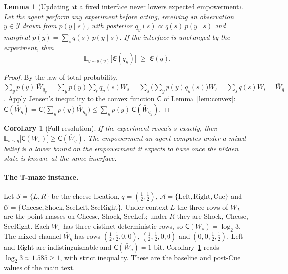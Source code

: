 \documentclass[letterpaper]{article} %
\newtheorem{lemma}{Lemma}
\newtheorem{corollary}{Corollary}
\theoremstyle{definition}
\providecommand{\E}{\mathbb{E}}
\providecommand{\cA}{\mathcal{A}}
\providecommand{\cO}{\mathcal{O}}
\providecommand{\cS}{\mathcal{S}}
\providecommand{\Emp}{\mathfrak{E}}
\providecommand{\Capa}{\mathsf{C}}
\begin{document}
\begin{lemma}[Updating at a fixed interface never lowers expected empowerment]
\label{lem:update}
Let the agent perform any experiment before acting, receiving an observation $y \in \mathcal{Y}$ drawn from $p(y \mid s)$, with posterior $q_y(s) \propto q(s)\, p(y \mid s)$ and marginal $p(y) = \sum_s q(s)\, p(y \mid s)$. If the interface is unchanged by the experiment, then
\begin{equation}
  \E_{y \sim p(y)}\big[\Emp(q_y)\big] \;\ge\; \Emp(q).
  \label{eq:update}
\end{equation}
\end{lemma}
\begin{proof}
By the law of total probability, $\sum_y p(y)\, \bar W_{q_y} = \sum_y p(y) \sum_s q_y(s) W_s = \sum_s \big(\sum_y p(y) q_y(s)\big) W_s = \sum_s q(s) W_s = \bar W_q$. Apply Jensen's inequality to the convex function $\Capa$ of Lemma~\ref{lem:convex}: $\Capa(\bar W_q) = \Capa\big(\sum_y p(y) \bar W_{q_y}\big) \le \sum_y p(y)\, \Capa(\bar W_{q_y})$.
\end{proof}

\begin{corollary}[Full resolution]
\label{cor:resolve}
If the experiment reveals $s$ exactly, then $\E_{s \sim q}\big[\Capa(W_s)\big] \ge \Capa(\bar W_q)$. The empowerment an agent computes under a mixed belief is a lower bound on the empowerment it expects to have once the hidden state is known, at the same interface.
\end{corollary}

\paragraph{The T-maze instance.}
Let $\cS = \{L, R\}$ be the cheese location, $q = (\tfrac12, \tfrac12)$, $\cA = \{\text{Left}, \text{Right}, \text{Cue}\}$ and $\cO = \{\text{Cheese}, \text{Shock}, \text{SeeLeft}, \text{SeeRight}\}$. Under context $L$ the three rows of $W_L$ are the point masses on Cheese, Shock, SeeLeft; under $R$ they are Shock, Cheese, SeeRight. Each $W_s$ has three distinct deterministic rows, so $\Capa(W_s) = \log_2 3$. The mixed channel $\bar W_q$ has rows $(\tfrac12, \tfrac12, 0, 0)$, $(\tfrac12, \tfrac12, 0, 0)$ and $(0, 0, \tfrac12, \tfrac12)$. Left and Right are indistinguishable and $\Capa(\bar W_q) = 1$ bit. Corollary~\ref{cor:resolve} reads $\log_2 3 \approx 1.585 \ge 1$, with strict inequality. These are the baseline and post-Cue values of the main text.
\end{document}
